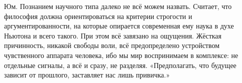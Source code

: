 Юм. Познанием научного типа далеко не всё можем назвать. 
Считает, что философия должна ориентироваться на критерии строгости и аргументированности, на которые опирается современная ему наука в духе Ньютона и всего такого. 
При этом всё завязано на ощущения. Жёсткая причинность, никакой свободы воли, всё предопределено устройством чувственного аппарата человека, ибо мы мир воспринимаем в комплексе: не отдельные сигналы, а всё и сразу, не разделяя.
«Предполагать, что будущее зависит от прошлого, заставляет нас лишь привичка.»